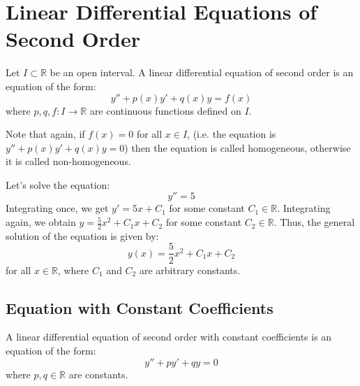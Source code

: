 \section{Linear Differential Equations of Second Order}
\begin{definition}
    Let $I \subset \mathbb{R}$ be an open interval. A linear differential equation of second order is an equation of the form:
    \[
        y'' + p(x) y' + q(x) y = f(x)
    \]
    where $p, q, f: I \to \mathbb{R}$ are continuous functions defined on $I$.
\end{definition}
Note that again, if $f(x) = 0$ for all $x \in I$, (i.e. the equation is $y'' + p(x) y' + q(x) y = 0$) then the equation is called homogeneous, otherwise it is called non-homogeneous.

\begin{eg}
    Let's solve the equation:
    \[
        y'' = 5
    \]
    Integrating once, we get $y' = 5x + C_1$ for some constant $C_1 \in \mathbb{R}$. Integrating again, we obtain $y = \frac{5}{2} x^2 + C_1 x + C_2$ for some constant $C_2 \in \mathbb{R}$. Thus, the general solution of the equation is given by:
    \[
        y(x) = \frac{5}{2} x^2 + C_1 x + C_2
    \]
    for all $x \in \mathbb{R}$, where $C_1$ and $C_2$ are arbitrary constants.
\end{eg}

\subsection{Equation with Constant Coefficients}
\begin{definition}
    A linear differential equation of second order with constant coefficients is an equation of the form:
    \[
        y'' + py' + qy = 0
    \]
    where $p, q \in \mathbb{R}$ are constants.
\end{definition}

